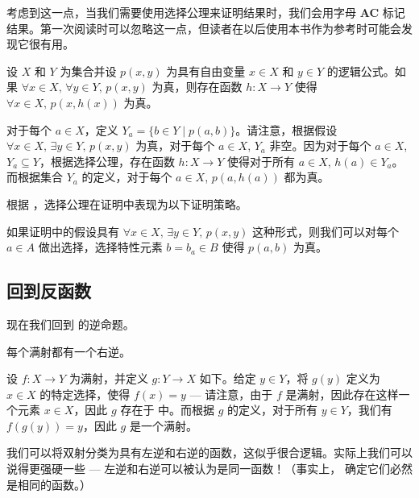 考虑到这一点，当我们需要使用选择公理来证明结果时，我们会用字母 {\small \textbf{AC}} 标记结果。第一次阅读时可以忽略这一点，但读者在以后使用本书作为参考时可能会发现它很有用。

\begin{propositionac}
\label{propUsingAC}
设 $X$ 和 $Y$ 为集合并设 $p(x,y)$ 为具有自由变量 $x \in X$ 和 $y \in Y$ 的逻辑公式。如果 $\forall x \in X,\, \forall y \in Y,\, p(x,y)$ 为真，则存在函数 $h : X \to Y$ 使得 $\forall x \in X,\, p(x,h(x))$ 为真。
\end{propositionac}

\begin{cproof}
对于每个 $a \in X$，定义 $Y_a = \{ b \in Y \mid p(a,b) \}$。请注意，根据假设 $\forall x \in X,\, \exists y \in Y,\, p(x,y)$ 为真，对于每个 $a \in X$, $Y_a$ 非空。因为对于每个 $a \in X$, $Y_a \subseteq Y$，根据选择公理，存在函数 $h : X \to Y$ 使得对于所有 $a \in X$, $h(a) \in Y_a$。而根据集合 $Y_a$ 的定义，对于每个 $a \in X$, $p(a,h(a))$ 都为真。
\end{cproof}

根据 ，选择公理在证明中表现为以下证明策略。

\begin{strategyac}[做出选择]
\label{strUsingAC}
如果证明中的假设具有 $\forall x \in X,\, \exists y \in Y,\, p(x,y)$ 这种形式，则我们可以对每个 $a \in A$ 做出选择，选择特性元素 $b = b_a \in B$ 使得 $p(a,b)$ 为真。
\end{strategyac}

\subsection*{回到反函数}

现在我们回到  的逆命题。

\begin{propositionac}
每个满射都有一个右逆。
\end{propositionac}

\begin{cproof}
设 $f : X \to Y$ 为满射，并定义 $g : Y \to X$ 如下。给定 $y \in Y$，将 $g(y)$ 定义为 $x \in X$ 的特定选择，使得 $f(x) = y$ --- 请注意，由于 $f$ 是满射，因此存在这样一个元素 $x \in X$，因此 $g$ 存在于  中。而根据 $g$ 的定义，对于所有 $y \in Y$，我们有 $f(g(y)) = y$，因此 $g$ 是一个满射。
\end{cproof}

我们可以将双射分类为具有左逆和右逆的函数，这似乎很合逻辑。实际上我们可以说得更强硬一些 --- 左逆和右逆可以被认为是同一函数！（事实上， 确定它们必然是相同的函数。） 


